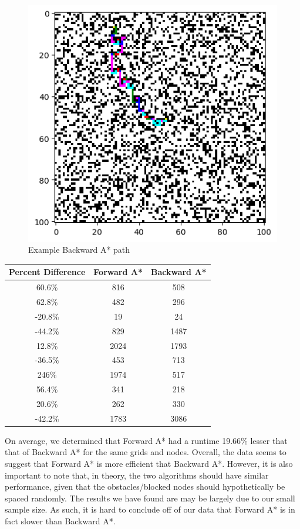 \documentclass{article}
\begin{document}
\begin{figure}
	\caption{Example Backward A* path}
	\centering
	\includegraphics[scale=0.75]{visB}
\end{figure}
\begin{center}
	\begin{tabular}{|c|c|c|}
		\hline
		Percent Difference & Forward A* & Backward A* \\
		\hline
		60.6\% & 816 & 508 \\
		62.8\% & 482 & 296 \\
		-20.8\% & 19 & 24 \\
		-44.2\% & 829 & 1487 \\
		12.8\% & 2024 & 1793 \\
		-36.5\% & 453 & 713 \\
		246\% & 1974 & 517 \\
		56.4\% & 341 & 218 \\
		20.6\% & 262 & 330 \\
		-42.2\% & 1783 & 3086 \\
		\hline
	\end{tabular}
\end{center}

On average, we determined that Forward A* had a runtime 19.66\% lesser that that of Backward A* for the same grids and nodes. Overall, the data seems to suggest that Forward A* is more efficient that Backward A*. However, it is also important to note that, in theory, the two algorithms should have similar performance, given that the obstacles/blocked nodes should hypothetically be spaced randomly. The results we have found are may be largely due to our small sample size. As such, it is hard to conclude off of our data that Forward A* is in fact slower than Backward A*.
\end{document}
